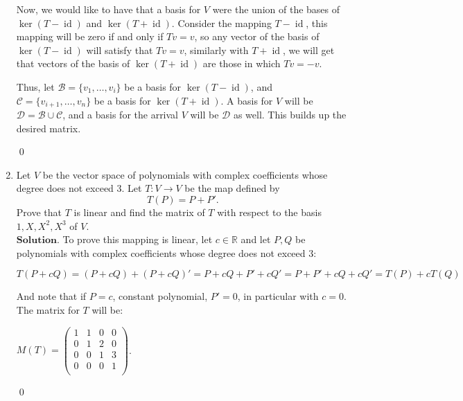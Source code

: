 \documentclass{article}
\theoremstyle{remark}
\begin{document}
\begin{enumerate}
        Now, we would like to have that a basis for $V$ were the union of the bases of $\ker(T-\operatorname{id})$ and $\ker(T + \operatorname{id})$.
        Consider the mapping $T - \operatorname{id}$, this mapping will be zero if and only if $Tv = v$, so any vector of the basis of $\ker(T-\operatorname{id})$
        will satisfy that $Tv = v$, similarly with $T + \operatorname{id}$, we will get that vectors of the basis of $\ker (T + \operatorname{id})$ are those in which
        $Tv = -v$.

        Thus, let $\mathcal{B} = \{v_1, \dots, v_i\}$ be a basis for $\ker(T-\operatorname{id})$, and $\mathcal{C} = \{v_{i+1}, \dots, v_{n}\}$ be a basis for $\ker(T+\operatorname{id})$.
        A basis for $V$ will be $\mathcal{D} = \mathcal{B} \cup \mathcal{C}$, and a basis for the arrival $V$ will be $\mathcal{D}$ as well.
        This builds up the desired matrix.
        \begin{flushright}
            \qed
        \end{flushright}
        \item Let \( V \) be the vector space of polynomials with complex coefficients whose degree does not exceed 3. Let \( T: V \to V \) be the map defined by 
        \[
        T(P) = P + P'.
        \]
        Prove that \( T \) is linear and find the matrix of \( T \) with respect to the basis \( 1, X, X^2, X^3 \) of \( V \).\\
        $\textbf{Solution.}$
        To prove this mapping is linear, let $c \in \mathbb{R}$ and let $P, Q$ be polynomials with complex coefficients whose degree does not exceed 3:
        \begin{center}
            $T(P+cQ) = (P + cQ) + (P + cQ)' = P + cQ + P' + cQ'
            = P + P' + cQ + cQ' = T(P) + cT(Q)$
        \end{center}
        And note that if $P = c$, constant polynomial, $P' = 0$, in particular with $c = 0$.
        The matrix for $T$ will be:
        \begin{center}
            $M(T) =
            \begin{pmatrix}
                1 & 1 & 0 & 0 \\
                0 & 1 & 2 & 0 \\
                0 & 0 & 1 & 3 \\
                0 & 0 & 0 & 1 \\
            \end{pmatrix}$.
        \end{center}
        \begin{flushright}
            \qed
        \end{flushright}


\end{enumerate}
\end{document}
